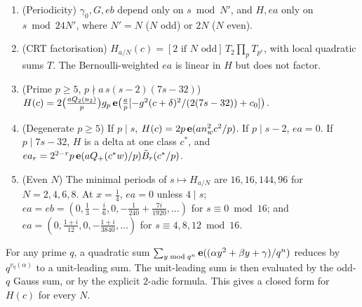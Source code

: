 \begin{proposition}[General $x=a/N$ \src{34}, \S3, C.1--C.3]\label{prop:crt6}
\begin{enumerate}[label=(\roman*)]
\item (Periodicity) $\gamma_0,G,eb$ depend only on $s\bmod N'$, and $H,ea$ only on $s\bmod24N'$, where $N'=N$ ($N$ odd) or $2N$ ($N$ even).
\item (CRT factorisation) $H_{a/N}(c)=[2\text{ if $N$ odd}]\,T_2\prod_pT_{p^e}$, with local quadratic sums $T$. The Bernoulli-weighted $ea$ is linear in $H$ but does not factor.
\item (Prime $p\ge5$, $p\nmid a\,s(s-2)(7s-32)$) $H(c)=2\big(\tfrac{aQ_2(u_2)}p\big)g_p\,\mathbf{e}\big(\tfrac ap[-g^2(c+\delta)^2/(2(7s-32))+c_0]\big)$.
\item (Degenerate $p\ge5$) If $p\mid s$, $H(c)=2p\,\mathbf{e}(an_w^2c^2/p)$. If $p\mid s-2$, $ea=0$. If $p\mid7s-32$, $H$ is a delta at one class $c^*$, and $ea_r=2^{2-r}p\,\mathbf{e}(aQ_+(c^*w)/p)\tilde B_r(c^*/p)$.
\item (Even $N$) The minimal periods of $s\mapsto H_{a/N}$ are $16,16,144,96$ for $N=2,4,6,8$. At $x=\tfrac14$, $ea=0$ unless $4\mid s$; $ea=eb=(0,\tfrac13-\tfrac i6,0,-\tfrac1{240}+\tfrac{7i}{1920},\dots)$ for $s\equiv0\bmod16$; and $ea=(0,\tfrac{1+i}{12},0,-\tfrac{1+i}{3840},\dots)$ for $s\equiv4,8,12\bmod16$.
\end{enumerate}
\end{proposition}
\begin{lemma}\label{lem:qred6}
For any prime $q$, a quadratic sum $\sum_{y\bmod q^n}\mathbf{e}((\alpha y^2+\beta y+\gamma)/q^n)$ reduces by $q^{v_q(\alpha)}$ to a unit-leading sum. The unit-leading sum is then evaluated by the odd-$q$ Gauss sum, or by the explicit $2$-adic formula. This gives a closed form for $H(c)$ for every $N$.
\end{lemma}

